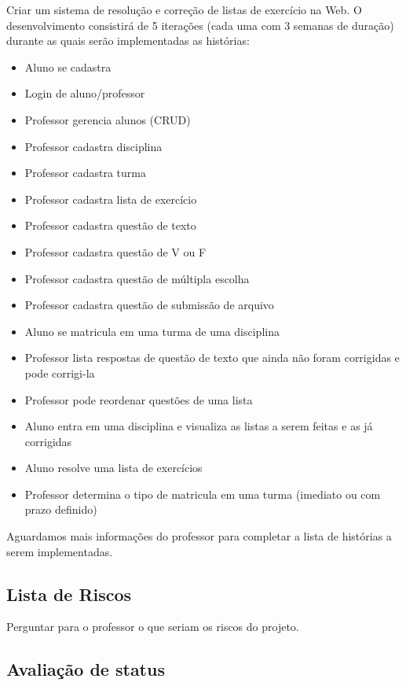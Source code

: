 \documentclass[12pt,letterpaper]{article}
\begin{document}
Criar um sistema de resolução e correção de listas de exercício na Web.
O desenvolvimento consistirá de 5 iterações (cada uma com 3 semanas de duração) durante as quais serão implementadas as histórias:

\begin{itemize}
\item{Aluno se cadastra}
\item{Login de aluno/professor}
\item{Professor gerencia alunos (CRUD)}
\item{Professor cadastra disciplina}
\item{Professor cadastra turma}
\item{Professor cadastra lista de exercício}
\item{Professor cadastra questão de texto}
\item{Professor cadastra questão de V ou F}
\item{Professor cadastra questão de múltipla escolha}
\item{Professor cadastra questão de submissão de arquivo}
\item{Aluno se matricula em uma turma de uma disciplina}
\item{Professor lista respostas de questão de texto que ainda não foram corrigidas e pode corrigi-la}
\item{Professor pode reordenar questões de uma lista}
\item{Aluno entra em uma disciplina e visualiza as listas a serem feitas e as já corrigidas}
\item{Aluno resolve uma lista de exercícios}
\item{Professor determina o tipo de matricula em uma turma (imediato ou com prazo definido)}
\end{itemize}
Aguardamos mais informações do professor para completar a lista de histórias a serem implementadas.

\pagebreak

\subsection{Lista de Riscos}

Perguntar para o professor o que seriam os riscos do projeto.

\pagebreak

\subsection{Avaliação de status}
\end{document}
